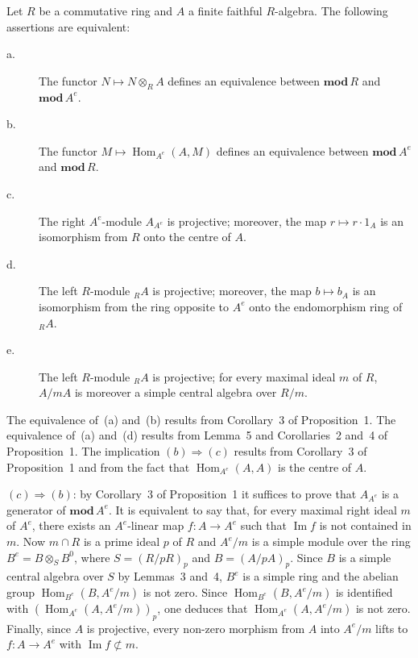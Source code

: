 \begin{proposition}
Let $R$ be a commutative ring and $A$ a finite faithful $R$-algebra.
The following assertions are equivalent:
\begin{description}
\item[\normalfont a.] The functor $N\mapsto N\otimes_R A$ defines an
      equivalence between $\mathbf{mod}\,R$ and $\mathbf{mod}\,A^e$.
\item[\normalfont b.] The functor
      $M\mapsto\operatorname{Hom}_{A^e}(A,M)$ defines an equivalence
      between $\mathbf{mod}\,A^e$ and $\mathbf{mod}\,R$.
\item[\normalfont c.] The right $A^e$-module $A_{A^e}$ is projective;
      moreover, the map $r\mapsto r\cdot 1_A$ is an isomorphism from
      $R$ onto the centre of $A$.
\item[\normalfont d.] The left $R$-module ${}_RA$ is projective;
      moreover, the map $b\mapsto b_A$ is an isomorphism from the ring
      opposite to $A^e$ onto the endomorphism ring of ${}_RA$.
\item[\normalfont e.] The left $R$-module ${}_RA$ is projective; for
      every maximal ideal $m$ of $R$, $A/mA$ is moreover a simple
      central algebra over $R/m$.
\end{description}
\end{proposition}

The equivalence of~(a) and~(b) results from Corollary~3 of
Proposition~1.  The equivalence of~(a) and~(d) results from Lemma~5 and
Corollaries~2 and~4 of Proposition~1.  The implication
$(b)\Rightarrow(c)$ results from Corollary~3 of Proposition~1 and from
the fact that $\operatorname{Hom}_{A^e}(A,A)$ is the centre of $A$.

$(c)\Rightarrow(b)$: by Corollary~3 of Proposition~1 it suffices to
prove that $A_{A^e}$ is a generator of $\mathbf{mod}\,A^e$.  It is
equivalent to say that, for every maximal right ideal $m$ of $A^e$,
there exists an $A^e$-linear map $f\colon A\to A^e$ such that
$\operatorname{Im}f$ is not contained in $m$.  Now $m\cap R$ is a
prime ideal $p$ of $R$ and $A^e/m$ is a simple module over the ring
$B^e=B\otimes_S B^0$, where $S=(R/pR)_p$ and $B=(A/pA)_p$.  Since $B$
is a simple central algebra over $S$ by Lemmas~3 and~4, $B^e$ is a
simple ring and the abelian group
$\operatorname{Hom}_{B^e}(B,A^e/m)$ is not zero.  Since
$\operatorname{Hom}_{B^e}(B,A^e/m)$ is identified with
$(\operatorname{Hom}_{A^e}(A,A^e/m))_p$, one deduces that
$\operatorname{Hom}_{A^e}(A,A^e/m)$ is not zero.  Finally, since $A$
is projective, every non-zero morphism from $A$ into $A^e/m$ lifts to
$f\colon A\to A^e$ with $\operatorname{Im}f\not\subset m$.

